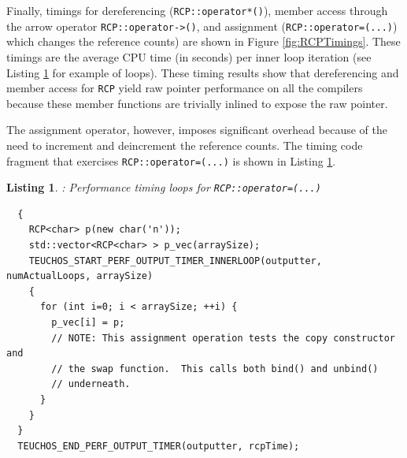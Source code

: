 \documentclass[pdf,ps2pdf,11pt]{SANDreport}
\newtheorem{listing}{Listing}
\begin{document}
Finally, timings for dereferencing ({}\texttt{RCP::operator*()}),
member access through the arrow operator
{}\texttt{RCP::operator->()}, and assignment
({}\texttt{RCP::operator=(...)}) which changes the reference counts)
are shown in Figure {}\ref{fig:RCPTimings}.  These timings are the
average CPU time (in seconds) per inner loop iteration (see Listing
{}\ref{listing:RCP-assignment-timing} for example of loops).  These
timing results show that dereferencing and member access for
{}\texttt{RCP} yield raw pointer performance on all the compilers
because these member functions are trivially inlined to expose the raw
pointer.

The assignment operator, however, imposes significant overhead because
of the need to increment and deincrement the reference counts.  The
timing code fragment that exercises {}\texttt{RCP::operator=(...)} is
shown in Listing {}\ref{listing:RCP-assignment-timing}.


\begin{listing}: Performance timing loops for {}\texttt{RCP::operator=(...)} \\
\label{listing:RCP-assignment-timing}
{\small\begin{verbatim}
  {
    RCP<char> p(new char('n'));
    std::vector<RCP<char> > p_vec(arraySize);
    TEUCHOS_START_PERF_OUTPUT_TIMER_INNERLOOP(outputter, numActualLoops, arraySize)
    {
      for (int i=0; i < arraySize; ++i) {
        p_vec[i] = p;
        // NOTE: This assignment operation tests the copy constructor and
        // the swap function.  This calls both bind() and unbind()
        // underneath.
      }
    }
  }
  TEUCHOS_END_PERF_OUTPUT_TIMER(outputter, rcpTime);
\end{verbatim}}
\end{listing}
\end{document}
